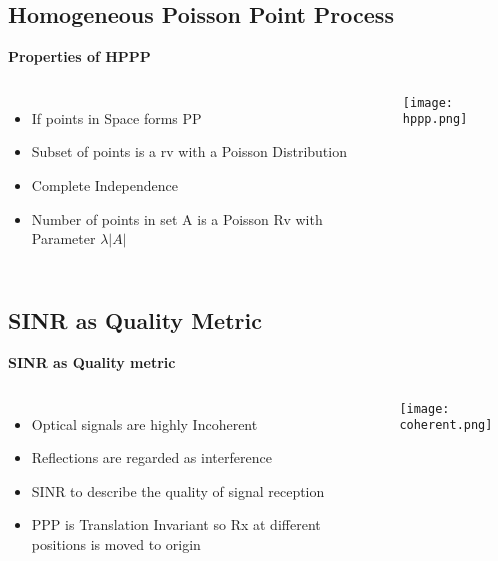 \documentclass[9pt, dvipsnames]{beamer} %
\begin{document}
\subsection{Homogeneous Poisson Point Process}
 
   \begin{frame}{\textbf {Properties of HPPP}}
           \begin{columns}
          
             \begin{itemize}
              \item If points in Space forms PP
              \item Subset of points is a rv with a Poisson Distribution
              \item Complete Independence
              \item Number of points in set A is a Poisson Rv with Parameter $\lambda |A|$
             \end{itemize}
           \texttt{[image: hppp.png]}
          \end{columns}
   \end{frame}

\subsection{SINR as Quality Metric}
 
   \begin{frame}{\textbf {SINR as Quality metric}}
           \begin{columns}
          
             \begin{itemize}
              \item Optical signals are highly Incoherent
              \item Reflections are regarded as interference
              \item SINR to describe the quality of signal reception
              \item PPP is Translation Invariant so Rx at different positions is moved to origin
             \end{itemize}
           \texttt{[image: coherent.png]}
          \end{columns}
   \end{frame}
   
\end{document}
